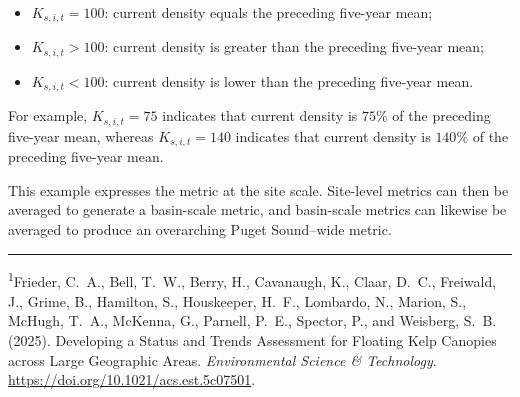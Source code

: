 \documentclass[11pt]{article}
\begin{document}
	\begin{itemize}
		\item \(K_{s,i,t} = 100\): current density equals the preceding
		five-year mean;
		\item \(K_{s,i,t} > 100\): current density is greater than the
		preceding five-year mean;
		\item \(K_{s,i,t} < 100\): current density is lower than the
		preceding five-year mean.
	\end{itemize}
	
	For example, \(K_{s,i,t}=75\) indicates that current density is
	\(75\%\) of the preceding five-year mean, whereas
	\(K_{s,i,t}=140\) indicates that current density is \(140\%\) of the
	preceding five-year mean.
	
	\vspace{5mm}
	
This example expresses the metric at the site scale. 
Site-level metrics can then be averaged to generate a basin-scale metric, and 
basin-scale metrics can likewise be averaged to produce an overarching Puget 
Sound–wide metric.
	
	\vspace{1em}
	
	\noindent\rule{0.36\textwidth}{0.4pt}
	
	\vspace{0.35em}
	
	{\footnotesize
		\textsuperscript{1}Frieder, C.~A., Bell, T.~W., Berry, H., Cavanaugh, 
		K.,
		Claar, D.~C., Freiwald, J., Grime, B., Hamilton, S., Houskeeper, H.~F.,
		Lombardo, N., Marion, S., McHugh, T.~A., McKenna, G., Parnell, P.~E.,
		Spector, P., and Weisberg, S.~B. (2025). Developing a Status and Trends
		Assessment for Floating Kelp Canopies across Large Geographic Areas.
		\textit{Environmental Science \& Technology}.
		\url{https://doi.org/10.1021/acs.est.5c07501}.
	}
	
\end{document}
